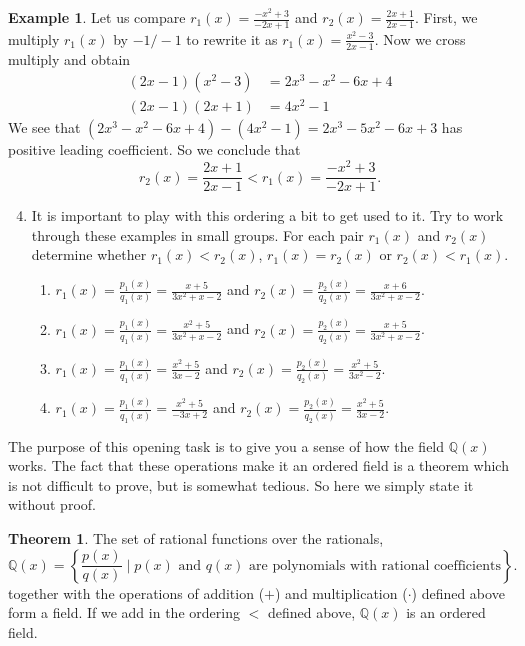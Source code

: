 \documentclass[11pt]{article}
\newenvironment{task}
	{\begin{mdframed}[linecolor=lightgray, linewidth=3pt]\raggedright}
	{\end{mdframed}}
\theoremstyle{definition}
\newtheorem{example}[theorem]{Example}
\newtheorem*{theorem*}{Theorem}
\begin{document}
\begin{task}
\begin{example}
  Let us compare $r_1(x) = \frac{-x^2+3}{-2x+1}$ and $r_2(x) = \frac{2x+1}{2x-1}$. First, we multiply $r_1(x)$ by $-1/-1$ to rewrite it as
  $r_1(x) = \frac{x^2-3}{2x-1}$. Now we cross multiply and obtain
  \begin{align*}
    (2x-1)(x^2-3) &= 2x^3-x^2-6x +4\\
    (2x-1)(2x+1) &= 4x^2-1
  \end{align*}
  We see that $(2x^3-x^2-6x +4)- (4x^2-1) = 2x^3-5x^2-6x+3$ has positive leading coefficient. So we conclude that
  \[r_2(x) = \frac{2x+1}{2x-1} < r_1(x) = \frac{-x^2+3}{-2x+1}. \]
\end{example}

\begin{enumerate}
    \setcounter{enumi}{3}
  \item It is important to play with this ordering a bit to get used to it. Try to work through these examples in small groups. For each pair $r_1(x)$ and $r_2(x)$
    determine whether $r_1(x) < r_2(x)$, $r_1(x)=r_2(x)$ or $r_2(x) < r_1(x)$.
    \begin{enumerate}
      \item  $r_1(x) = \frac{p_1(x)}{q_1(x)} = \frac{x+5}{3x^2+x-2}$ and $r_2(x) = \frac{p_2(x)}{q_2(x)}=\frac{x+6}{3x^2+x-2}$.
      \item  $r_1(x) = \frac{p_1(x)}{q_1(x)} = \frac{x^2+5}{3x^2+x-2}$ and $r_2(x) = \frac{p_2(x)}{q_2(x)}=\frac{x+5}{3x^2+x-2}$.
      \item  $r_1(x) = \frac{p_1(x)}{q_1(x)} = \frac{x^2+5}{3x-2}$ and $r_2(x) = \frac{p_2(x)}{q_2(x)}=\frac{x^2+5}{3x^2-2}$.
      \item  $r_1(x) = \frac{p_1(x)}{q_1(x)} = \frac{x^2+5}{-3x+2}$ and $r_2(x) = \frac{p_2(x)}{q_2(x)}=\frac{x^2+5}{3x-2}$.
    \end{enumerate}
\end{enumerate}

The purpose of this opening task is to give you a sense of how the field $\mathbb{Q}(x)$ works. The fact that these operations make it an ordered field is
a theorem which is not difficult to prove, but is somewhat tedious. So here we simply state it without proof.

\begin{theorem*}
  The set of rational functions over the rationals,
\[ \mathbb{Q}(x) = \left\{ \frac{p(x)}{q(x)} \mid p(x) \text{ and }q(x)\text{ are polynomials with rational coefficients} \right\}.\]
together with the operations of addition ($+$) and multiplication ($\cdot$) defined above form a field. If we add in the ordering $<$ defined above,
$\mathbb{Q}(x)$ is an ordered field.
\end{theorem*}


\end{task}
\end{document}
